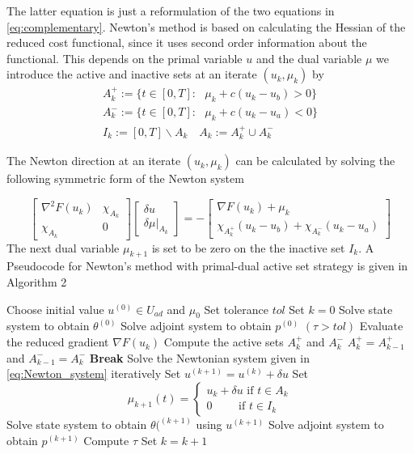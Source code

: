 The latter equation is just a reformulation of the two equations in \eqref{eq:complementary}. Newton's method is based on calculating the Hessian of the reduced cost functional, since it uses second order information about the functional. This depends on the primal variable $u$ and the dual variable $\mu$ we introduce the active and inactive sets at an iterate $(u_k, \mu_k)$ by 
\begin{align}
    \label{eq:active_inactive}
    A_k^{+} := \{ t \in [0,T]: \text{ } \mu_k + c(u_k - u_b) >0 \} \\
    A_k^{-} := \{ t \in [0,T]: \text{ } \mu_k + c(u_k - u_a) <0 \} \\
    I_k := [0,T] \backslash A_k \quad A_k := A_k^{+} \cup A_k^{-}
\end{align}

The Newton direction at an iterate $(u_k, \mu_k)$ can be calculated by solving the following symmetric form of the Newton system

\begin{equation}
    \label{eq:Newton_system}
    \begin{bmatrix}
        \nabla^2 F(u_k) & \chi_{A_k} \\
        \chi_{A_k} & 0 
    \end{bmatrix}
    \begin{bmatrix}
    \delta u \\
    \delta \mu|_{A_k}
    \end{bmatrix}
    = - \begin{bmatrix}
    \nabla F(u_k) + \mu_k \\
    \chi_{A_k^{+}}(u_k - u_b) + \chi_{A_k^{-}}(u_k - u_a)
    \end{bmatrix}
\end{equation}
The next dual variable $\mu_{k+1}$ is set to be zero on the the inactive set $I_k$. A Pseudocode for Newton's method with primal-dual active set strategy is given in Algorithm 2

\begin{codebox}
\li Choose initial value $u^{(0)} \in U_{ad}$ and $\mu_0$ 
\li Set tolerance $tol$
\li Set $k = 0$
\li Solve state system to obtain $\theta^{(0)}$
\li Solve adjoint system to obtain $p^{(0)}$
\li \While $(\tau > tol)$ \Then 
\li Evaluate the reduced gradient $\nabla F(u_k)$
\li Compute the active sets $A_k^{+}$ and $A_k^{-}$
\li \If $A_k^{+} = A_{k-1}^{+}$ and $A_{k-1}^{-} = A_k^{-}$ \Then 
\li \textbf{Break} \End
\li Solve the Newtonian system given in \eqref{eq:Newton_system} iteratively
\li Set $u^{(k+1)} = u^{(k)} + \delta u$  
\li Set 
\begin{equation*}
    \mu_{k+1}(t) = 
    \begin{cases}
     u_k + \delta u \text{ if } t \in A_k \\
     0 \qquad \text{ if } t \in I_k
     \end{cases}
\end{equation*}
\li Solve state system to obtain $\theta(^{(k+1)}$ using $u^{(k+1)}$
\li Solve adjoint system to obtain $p^{(k+1)}$ 
\li Compute $\tau$
\li Set $k = k+1$
\end{codebox}


